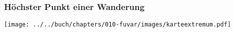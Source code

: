 %
%
%
\bgroup
\begin{frame}[t]
\setlength{\abovedisplayskip}{5pt}
\setlength{\belowdisplayskip}{5pt}
\frametitle{Höchster Punkt einer Wanderung}
\vspace*{-3pt}
\begin{center}
\texttt{[image: ../../buch/chapters/010-fuvar/images/karteextremum.pdf]}
\end{center}
\end{frame}
\egroup
